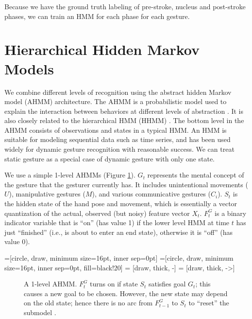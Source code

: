 Because we have the ground truth labeling of pre-stroke, nucleus and post-stroke phases, 
we can train an HMM for each phase for each gesture. 

\section{Hierarchical Hidden Markov Models}
We combine different levels of recognition using the abstract hidden Markov
model (AHMM) architecture. The AHMM is a probabilistic model used to explain the
interaction between behaviors at different levels of abstraction \cite{johns05}.
It is also closely related to the hierarchical HMM (HHMM) \cite{fine98}. The bottom level in the AHMM 
consists of observations and states in a typical HMM. An HMM is suitable for 
modeling sequential data such as time series, and has been used widely for 
dynamic gesture recognition with reasonable success. We can treat static gesture 
as a special case of dynamic gesture with only one state.

We use a simple 1-level AHMMs \cite{murphy02} (Figure
\ref{fig:amms}). $G_t$ represents the mental concept of the gesture that the
gesturer currently has. It includes unintentional movements ($U$), manipulative
gestures ($M$), and various communicative gestures ($C_i$). $S_t$ is the hidden
state of the hand pose and movement, which is essentially a vector quantization of the actual, observed 
(but noisy) feature vector $X_t$. $F_t^G$ is a binary indicator variable that is
``on'' (has value 1) if the lower level HMM at time $t$ has just ``finished''
(i.e., is about to enter an end state), otherwise it is ``off'' (has value 0).

=[circle, draw, minimum size=16pt, inner sep=0pt]
=[circle, draw, minimum size=16pt, inner sep=0pt,
               fill=black!20] 
 = [draw, thick, -]
 = [draw, thick, ->]

\begin{figure}[h]
\centering
  \caption{A 1-level AHMM. $F_t^G$ turns on if state $S_t$ satisfies goal
  $G_t$; this causes a new goal to be chosen. However, the new state may depend
  on the old state; hence there is no arc from $F_{t-1}^G$ to $S_t$ to
  ``reset'' the submodel \cite{murphy02}.}
  \label{fig:amms}
\end{figure}

